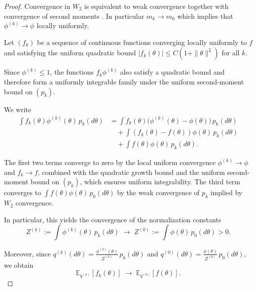 \documentclass[a4paper,11pt]{article}
\begin{document}
\begin{proof}
Convergence in $W_2$ is equivalent to weak convergence together with convergence of second moments \cite{Villani2009}. In particular $m_k\to m_0$ which implies that $\phi^{(k)}\to\phi$ locally uniformly.

Let $(f_k)$ be a sequence of continuous functions converging locally
uniformly to $f$ and satisfying the uniform quadratic bound
\(
|f_k(\theta)| \le C(1+\|\theta\|^2)
\) for all $k$.

Since $\phi^{(k)}\le1$, the functions $f_k\phi^{(k)}$ also satisfy a
quadratic bound and therefore form a uniformly integrable family under
the uniform second-moment bound on $(p_k)$.

We write
\begin{align}\label{eq:decomp_convergence}
\int f_k(\theta)\phi^{(k)}(\theta)\,p_k(d\theta)
&=
\int f_k(\theta)\big(\phi^{(k)}(\theta)-\phi(\theta)\big)\,p_k(d\theta)
\\
&\quad+
\int (f_k(\theta)-f(\theta))\phi(\theta)\,p_k(d\theta)
\\
&\quad+
\int f(\theta)\phi(\theta)\,p_k(d\theta).
\end{align}


The first two terms converge to zero by the local uniform convergence
$\phi^{(k)}\to\phi$ and $f_k\to f$, combined with the quadratic
growth bound and the uniform second-moment bound on $(p_k)$,
which ensures uniform integrability.
The third term converges to
\(
\int f(\theta)\phi(\theta)\,p_0(d\theta)
\)
by the weak convergence of $p_k$ implied by $W_2$ convergence.

In particular, this yields the convergence of the normalization constants
\[
Z^{(k)} := \int \phi^{(k)}(\theta)\,p_k(d\theta)
\;\longrightarrow\;
Z^{(0)} := \int \phi(\theta)\,p_0(d\theta) > 0.
\]

Moreover, since
\(
q^{(k)}(d\theta)
=
\frac{\phi^{(k)}(\theta)}{Z^{(k)}}\,p_k(d\theta)\) and 
\(
q^{(0)}(d\theta)
=
\frac{\phi(\theta)}{Z^{(0)}}\,p_0(d\theta),
\)
we obtain
\begin{equation}
\mathbb{E}_{q^{(k)}}[f_k(\theta)]
\;\longrightarrow\;
\mathbb{E}_{q^{(0)}}[f(\theta)]. 
\end{equation}

\end{proof}
\end{document}
